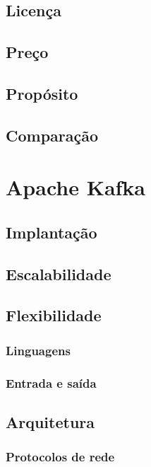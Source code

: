 \subsection{Licença}

\subsection{Preço}

\subsection{Propósito}

\subsection{Comparação}

\section{Apache Kafka}

\subsection{Implantação}

\subsection{Escalabilidade}

\subsection{Flexibilidade}

\subsubsection{Linguagens}
\subsubsection{Entrada e saída}

\subsection{Arquitetura}

\subsubsection{Protocolos de rede}

